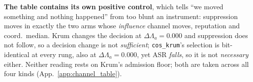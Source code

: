 \documentclass{article}
\begin{document}
\noindent \textbf{The table contains its own positive control}, which tells ``we moved something and nothing happened'' from too blunt an instrument: suppression moves in exactly the two arms whose \emph{influence} channel moves, reputation and coord.\ median. Krum changes the decision at $\Delta\Lambda_a{=}0.000$ and suppression does not follow, so a decision change is not \emph{sufficient}; \texttt{cos\_krum}'s selection is bit-identical at every rung, also at $\Delta\Lambda_a{=}0.000$, yet ASR \emph{falls}, so it is not \emph{necessary} either. Neither reading rests on Krum's admission floor; both are taken across all four kinds (App.~\ref{app:channel_table}).
\end{document}

